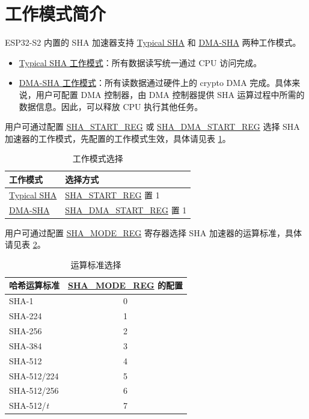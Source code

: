 \documentclass[main\_\_CN.tex]{subfiles}
\begin{document}
\section{工作模式简介}
ESP32-S2 内置的 SHA 加速器支持 \hyperref[subsection:typicalsha]{Typical SHA} 和 \hyperref[subsection:dma-sha]{DMA-SHA} 两种工作模式。

\begin{itemize}
    \item \hyperref[subsection:typicalsha]{Typical SHA 工作模式}：所有数据读写统一通过 CPU 访问完成。
    \item \hyperref[subsection:dma-sha]{DMA-SHA 工作模式}：所有读数据通过硬件上的 crypto DMA 完成。具体来说，用户可配置 DMA 控制器，由 DMA 控制器提供 SHA 运算过程中所需的数据信息。因此，可以释放 CPU 执行其他任务。
\end{itemize}

用户可通过配置 \hyperref[regdesc:SHASTARTREG]{SHA\_START\_REG} 或 \hyperref[regdesc:SHADMASTARTREG]{SHA\_DMA\_START\_REG} 选择 SHA 加速器的工作模式，先配置的工作模式生效，具体请见表 \ref{table:SHA_DMA_ENABLE}。

\begin{longtable}[c]{ |l|l| }
\caption{工作模式选择}
\label{table:SHA_DMA_ENABLE}
\\\hline
\rowcolor{lightgray}
工作模式      & 选择方式\\
    \hline
    \hyperref[subsection:typicalsha]{Typical SHA}      &  \hyperref[regdesc:SHASTARTREG]{SHA\_START\_REG} 置 1   \\
    \hline
    \hyperref[subsection:dma-sha]{DMA-SHA}           &  \hyperref[regdesc:SHADMASTARTREG]{SHA\_DMA\_START\_REG} 置 1   \\
    \hline
\end{longtable}

用户可通过配置 \hyperref[regdesc:SHAMODEREG]{SHA\_MODE\_REG} 寄存器选择 SHA 加速器的运算标准，具体请见表 \ref{table:mode summary}。

\begin{longtable}[c]{|l|c|}
\caption{运算标准选择}
\label{table:mode summary}
\\\hline
\rowcolor{lightgray}
哈希运算标准 & \hyperref[regdesc:SHAMODEREG]{SHA\_MODE\_REG} 的配置\\
    \hline
    SHA-1 & 0\\
    \hline
    SHA-224 & 1\\
    \hline
    SHA-256 & 2\\
    \hline
    SHA-384 & 3\\
    \hline
    SHA-512 & 4\\
    \hline
    SHA-512/224 & 5\\
    \hline
    SHA-512/256 & 6\\
    \hline
    SHA-512/{\it{t}} & 7\\
    \hline
\end{longtable}
\end{document}

